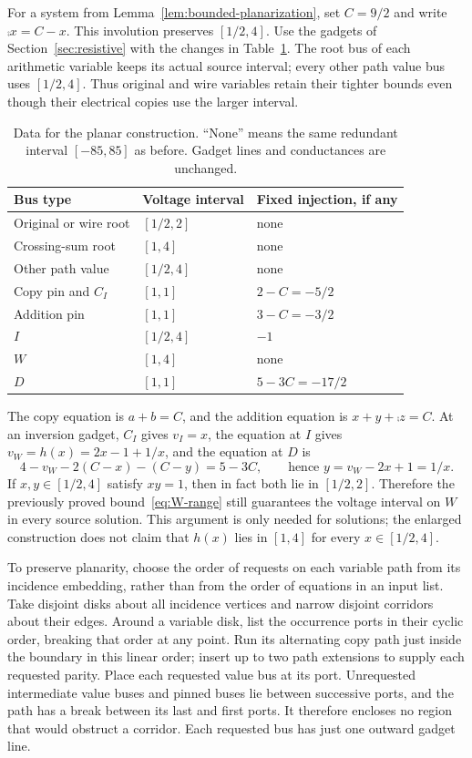 For a system from Lemma~\ref{lem:bounded-planarization}, set $C=9/2$ and
write $\comp{x}=C-x$. This involution preserves $[1/2,4]$.
Use the gadgets of Section~\ref{sec:resistive} with the changes in
Table~\ref{tab:planar-data}. The root bus of each arithmetic variable keeps
its actual source interval; every other path value bus uses $[1/2,4]$.
Thus original and wire variables retain their tighter bounds even though their
electrical copies use the larger interval.

\begin{table}[htbp]
\centering
\begin{tabular}{@{}lll@{}}
\toprule
Bus type & Voltage interval & Fixed injection, if any\\
\midrule
Original or wire root & $[1/2,2]$ & none\\
Crossing-sum root & $[1,4]$ & none\\
Other path value & $[1/2,4]$ & none\\
Copy pin and $C_I$ & $[1,1]$ & $2-C=-5/2$\\
Addition pin & $[1,1]$ & $3-C=-3/2$\\
$I$ & $[1/2,4]$ & $-1$\\
$W$ & $[1,4]$ & none\\
$D$ & $[1,1]$ & $5-3C=-17/2$\\
\bottomrule
\end{tabular}
\caption{Data for the planar construction. ``None'' means the same redundant
interval $[-85,85]$ as before. Gadget lines and conductances are unchanged.}
\label{tab:planar-data}
\end{table}

The copy equation is $a+b=C$, and the addition equation is
$x+y+\comp{z}=C$. At an inversion gadget, $C_I$ gives $v_I=x$,
the equation at $I$ gives $v_W=h(x)=2x-1+1/x$, and the equation at $D$ is
\[
 4-v_W-2(C-x)-(C-y)=5-3C,
 \qquad\text{hence }y=v_W-2x+1=1/x.
\]
If $x,y\in[1/2,4]$ satisfy $xy=1$, then in fact both lie in $[1/2,2]$.
Therefore the previously proved bound~\eqref{eq:W-range} still guarantees
the voltage interval on $W$ in every source solution. This argument is only
needed for solutions; the enlarged construction does not claim that $h(x)$
lies in $[1,4]$ for every $x\in[1/2,4]$.

To preserve planarity, choose the order of requests on each variable path
from its incidence embedding, rather than from the order of equations in an
input list. Take disjoint disks about all incidence vertices and narrow
disjoint corridors about their edges. Around a variable disk, list the
occurrence ports in their cyclic order, breaking that order at any point.
Run its alternating copy path just inside the boundary in this linear order;
insert up to two path extensions to supply each requested parity.
Place each requested value bus at its port. Unrequested intermediate value
buses and pinned buses lie between successive ports, and the path has a break
between its last and first ports. It therefore encloses no region that would
obstruct a corridor. Each requested bus has just one outward gadget line.


